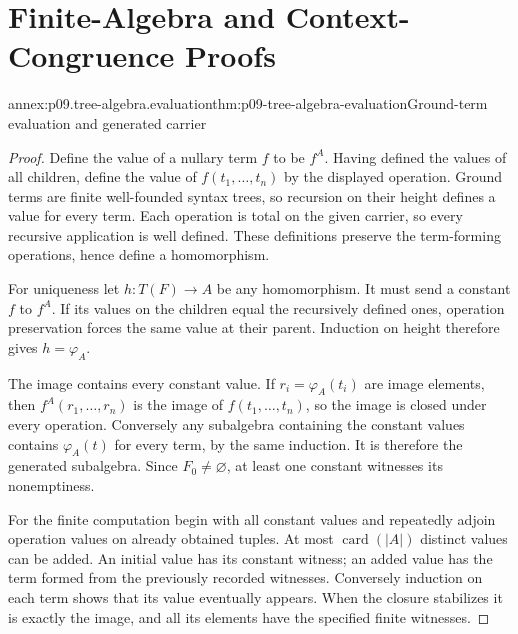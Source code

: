 \section{Finite-Algebra and Context-Congruence Proofs}
\label{sec:p09-tree-algebra-annex}

\begin{annexitem}{annex:p09.tree-algebra.evaluation}{thm:p09-tree-algebra-evaluation}{Ground-term evaluation and generated carrier}
\begin{proof}
Define the value of a nullary term \(f\) to be \(f^A\).
Having defined the values of all children, define the value of
\(f(t_1,\ldots,t_n)\) by the displayed operation. Ground terms are
finite well-founded syntax trees, so recursion on their height defines
a value for every term. Each operation is total on the given carrier,
so every recursive application is well defined. These definitions
preserve the term-forming operations, hence define a homomorphism.

For uniqueness let \(h:T(F)\to A\) be any homomorphism.
It must send a constant \(f\) to \(f^A\). If its values on the
children equal the recursively defined ones, operation preservation
forces the same value at their parent. Induction on height therefore
gives \(h=\varphi_A\).

The image contains every constant value. If \(r_i=\varphi_A(t_i)\)
are image elements, then \(f^A(r_1,\ldots,r_n)\) is the image of
\(f(t_1,\ldots,t_n)\), so the image is closed under every operation.
Conversely any subalgebra containing the constant values contains
\(\varphi_A(t)\) for every term, by the same induction.
It is therefore the generated subalgebra. Since \(F_0\ne\varnothing\),
at least one constant witnesses its nonemptiness.

For the finite computation begin with all constant values and repeatedly
adjoin operation values on already obtained tuples. At most
\(\operatorname{card}(|A|)\) distinct values can be added.
An initial value has its constant witness; an added value has the term
formed from the previously recorded witnesses. Conversely induction
on each term shows that its value eventually appears. When the closure
stabilizes it is exactly the image, and all its elements have the
specified finite witnesses.
\end{proof}
\end{annexitem}

